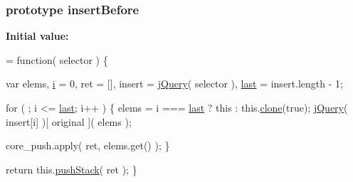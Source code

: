 \subsubsection[{insert\+Before}]{ {\bf prototype} insert\+Before}\label{jquery-1_810_82-vsdoc_8js_a5501f909e772d4b753879c11efe9b64f}
{\bfseries Initial value\+:}
\begin{DoxyCode}
= \textcolor{keyword}{function}( selector ) \{


        var elems,
            \hyperlink{_bibabook_2_scripts_2respond_8min_8js_a5e25b1d1bed9ab5f3174b76d6a722180}{i} = 0,
            ret = [],
            insert = \hyperlink{jquery-1_810_82-vsdoc_8js_add5237586d970a38a81f990e8eb28c6c}{jQuery}( selector ),
            \hyperlink{jquery-1_810_82-vsdoc_8js_a5a9684d230de11a6ec3029bcce128977}{last} = insert.length - 1;

        \textcolor{keywordflow}{for} ( ; i <= \hyperlink{jquery-1_810_82-vsdoc_8js_a5a9684d230de11a6ec3029bcce128977}{last}; i++ ) \{
            elems = i === \hyperlink{jquery-1_810_82-vsdoc_8js_a5a9684d230de11a6ec3029bcce128977}{last} ? \textcolor{keyword}{this} : this.\hyperlink{jquery-1_810_82-vsdoc_8js_a7d74ce76585989b4b6e2d506577e13ad}{clone}(\textcolor{keyword}{true});
            \hyperlink{jquery-1_810_82-vsdoc_8js_add5237586d970a38a81f990e8eb28c6c}{jQuery}( insert[i] )[ original ]( elems );

            
            core\_push.apply( ret, elems.get() );
        \}

        \textcolor{keywordflow}{return} this.\hyperlink{jquery-1_810_82-vsdoc_8js_afc3a7db1ef2b526338c06c07cecccd44}{pushStack}( ret );
    \}
\end{DoxyCode}
\hypertarget{jquery-1_810_82-vsdoc_8js_ab09af0fb8923d70813f6d128591d1962}{}
